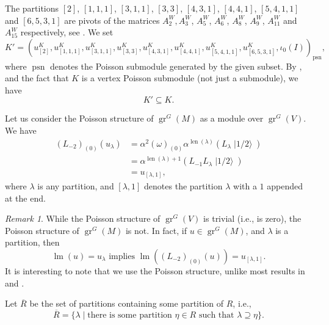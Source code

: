 \documentclass[a4paper, 12pt, reqno]{amsart}
\theoremstyle{remark}
\newtheorem{remark}[theorem]{Remark}
\DeclareMathOperator{\gr}{gr}
\DeclareMathOperator{\lm}{lm}
\DeclareMathOperator{\len}{len}
\DeclareMathOperator{\psn}{psn}
\DeclareMathOperator{\vachalf}{|1/2\rangle}
\begin{document}
The partitions $[2]$, $[1, 1, 1]$, $[3, 1, 1]$, $[3, 3]$, $[4, 3, 1]$, $[4, 4, 1]$, $[5, 4, 1, 1]$ and $[6, 5, 3, 1]$ are pivots of the matrices $A^W_2, A^W_3$, $A^W_5$, $A^W_6$, $A^W_8$, $A^W_9$, $A^W_{11}$ and $A^W_{15}$ respectively, see \cite[ising-modules.ipynb]{sagemath2}.
We set
\begin{equation*}
  K' = (u^K_{[2]}, u^K_{[1, 1, 1]}, u^K_{[3, 1, 1]}, u^K_{[3, 3]}, u^K_{[4, 3, 1]}, u^K_{[4, 4, 1]}, u^K_{[5, 4, 1, 1]}, u^K_{[6, 5, 3, 1]}, \iota_0(I))_{\psn},
\end{equation*}
where $\psn$ denotes the Poisson submodule generated by the given subset.
By ,  and the fact that $K$ is a vertex Poisson submodule (not just a submodule), we have
\begin{equation*}
  K' \subseteq K.
\end{equation*}

Let us consider the Poisson structure of $\gr^G(M)$ as a module over $\gr^G(V)$.
We have
\begin{align*}
  (L_{-2})_{(0)}(u_{\lambda}) &= \alpha^2(\omega)_{(0)}\alpha^{\len(\lambda)}(L_{\lambda}\vachalf) \\
                              &= \alpha^{\len(\lambda) + 1}(L_{-1}L_{\lambda}\vachalf) \\
                              &= u_{[\lambda, 1]},
\end{align*}
where $\lambda$ is any partition, and $[\lambda, 1]$ denotes the partition $\lambda$ with a $1$ appended at the end.

\begin{remark}
  \label{rmk:50}
  While the Poisson structure of $\gr^G(V)$ is trivial (i.e., is zero), the Poisson structure of $\gr^G(M)$ is not.
  In fact, if $u \in \gr^G(M)$, and $\lambda$ is a partition, then
  \begin{equation*}
    \lm(u) = u_{\lambda}\text{ implies }\lm((L_{-2})_{(0)}(u)) = u_{[\lambda, 1]}.
  \end{equation*}
  It is interesting to note that we use the Poisson structure, unlike most results in  and \cite{andrews_singular_2022}.
\end{remark}

Let $\overline{R}$ be the set of partitions containing some partition of $R$, i.e.,
\begin{equation*}
  \overline{R} = \{\lambda \mid \text{there is some partition $\eta \in R$ such that $\lambda \supseteq \eta$}\}.
\end{equation*}
\end{document}
